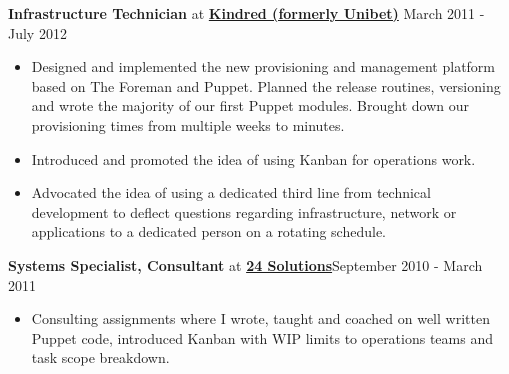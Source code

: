 \documentclass[8pt,sans]{article}
\newenvironment{outerlist}[1][\enskip\textbullet]%
        {\begin{itemize}[#1]}{\end{itemize}%
         \vspace{-.6\baselineskip}}
\newcommand{\blankline}{\quad\pagebreak[2]}
\begin{document}
\textbf{Infrastructure Technician} at \href{http://www.unibet.com}{\textbf{Kindred (formerly Unibet)}}  \hfill {March 2011 - July 2012}
\begin{outerlist}
    \item Designed and implemented the new provisioning and management platform based on The Foreman and Puppet. Planned the release routines, versioning and wrote the majority of our first Puppet modules. Brought down our provisioning times from multiple weeks to minutes.
	\item Introduced and promoted the idea of using Kanban for operations work.
	\item Advocated the idea of using a dedicated third line from technical development to deflect questions regarding infrastructure, network or applications to a dedicated person on a rotating schedule.
\end{outerlist}
\blankline

 \textbf{Systems Specialist, Consultant} at \href{http://www.24solutions.se}{\textbf{24 Solutions}}\hfill {September 2010 - March 2011}
\begin{outerlist}
	\item[] Consulting assignments where I wrote, taught and coached on well written Puppet code, introduced Kanban with WIP limits to operations teams and task scope breakdown.
\end{outerlist}
\blankline
\end{document}
